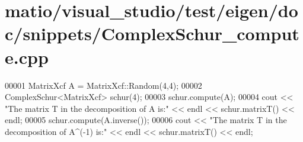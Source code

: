 \hypertarget{matio_2visual__studio_2test_2eigen_2doc_2snippets_2_complex_schur__compute_8cpp_source}{}\section{matio/visual\+\_\+studio/test/eigen/doc/snippets/\+Complex\+Schur\+\_\+compute.cpp}
\label{matio_2visual__studio_2test_2eigen_2doc_2snippets_2_complex_schur__compute_8cpp_source}

\begin{DoxyCode}
00001 MatrixXcf A = MatrixXcf::Random(4,4);
00002 ComplexSchur<MatrixXcf> schur(4);
00003 schur.compute(A);
00004 cout << \textcolor{stringliteral}{"The matrix T in the decomposition of A is:"} << endl << schur.matrixT() << endl;
00005 schur.compute(A.inverse());
00006 cout << \textcolor{stringliteral}{"The matrix T in the decomposition of A^(-1) is:"} << endl << schur.matrixT() << endl;
\end{DoxyCode}

